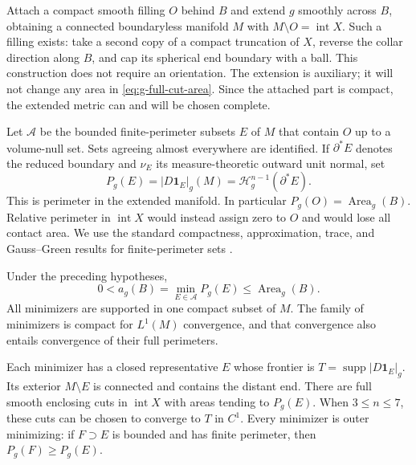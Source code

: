 Attach a compact smooth filling $O$ behind $B$ and extend $g$ smoothly
across $B$, obtaining a connected boundaryless manifold $M$ with
$M\setminus O=\operatorname{int}X$.  Such a filling exists: take a
second copy of a compact truncation of $X$, reverse the collar
direction along $B$, and cap its spherical end boundary with a ball.
This construction does not require an orientation.  The extension
is auxiliary; it will not change any area in
\eqref{eq:g-full-cut-area}.  Since the attached part is compact, the
extended metric can and will be chosen complete.

Let $\mathcal A$ be the bounded finite-perimeter subsets $E$ of $M$
that contain $O$ up to a volume-null set.  Sets agreeing almost
everywhere are identified.  If $\partial^*E$ denotes the reduced
boundary and $\nu_E$ its measure-theoretic outward unit normal, set
\begin{equation}
 P_g(E)=|D\mathbf1_E|_g(M)
       =\mathcal H^{n-1}_g(\partial^*E).
 \label{eq:g-full-perimeter}
\end{equation}
This is perimeter in the extended manifold.  In particular
$P_g(O)=\operatorname{Area}_g(B)$.  Relative perimeter in
$\operatorname{int}X$ would instead assign zero to $O$ and would lose
all contact area.  We use the standard compactness, approximation,
trace, and Gauss--Green results for finite-perimeter sets
\cite{AmbrosioFuscoPallara2000,Maggi2012}.

\begin{lemma}
\label{lem:g-enclosure}
Under the preceding hypotheses,
\begin{equation}
 0<a_g(B)=\min_{E\in\mathcal A}P_g(E)
         \le\operatorname{Area}_g(B).
 \label{eq:g-minimum}
\end{equation}
All minimizers are supported in one compact subset of $M$.  The family
of minimizers is compact for $L^1(M)$ convergence, and that convergence
also entails convergence of their full perimeters.

Each minimizer has a closed representative $E$ whose frontier is
$T=\operatorname{supp}|D\mathbf1_E|_g$.  Its exterior $M\setminus E$
is connected and contains the distant end.  There are full smooth
enclosing cuts in $\operatorname{int}X$ with areas tending to $P_g(E)$.
When $3\le n\le7$, these cuts can be chosen to converge to $T$ in
$C^1$.  Every minimizer is outer minimizing: if $F\supset E$ is
bounded and has finite perimeter, then $P_g(F)\ge P_g(E)$.
\end{lemma}

